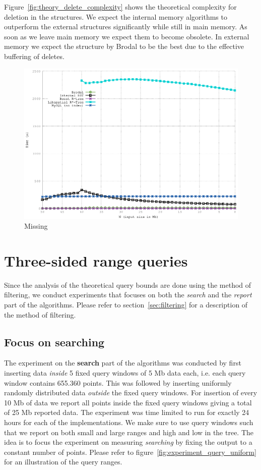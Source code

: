 \documentclass[twoside,11pt,openright]{report}
\begin{document}
Figure~\ref{fig:theory_delete_complexity} shows the theoretical complexity for deletion in the structures. We expect the internal memory algorithms to outperform the external structures significantly while still in main memory. As soon as we leave main memory we expect them to become obsolete. In external memory we expect the structure by Brodal to be the best due to the effective buffering of deletes.

\begin{figure}[htp!]
\includegraphics[width=\textwidth]{../src/experiments/delete_experiment_results/2016-05-27.10_10_14/time}
\caption{Missing}
\label{fig:delete_complexity_result}
\end{figure}

\clearpage

\section{Three-sided range queries}
Since the analysis of the theoretical query bounds are done using the method of filtering, we conduct experiments that focuses on both the \textit{search} and the \textit{report} part of the algorithms. Please refer to section~\ref{sec:filtering} for a description of the method of filtering.

\subsection{Focus on searching}
The experiment on the \textbf{search} part of the algorithms was conducted by first inserting data \textit{inside} 5 fixed query windows of 5 Mb data each, i.e. each query window contains 655.360 points. This was followed by inserting uniformly randomly distributed data \textit{outside} the fixed query windows. For insertion of every 10 Mb of data we report all points inside the fixed query windows giving a total of 25 Mb reported data. The experiment was time limited to run for exactly 24 hours for each of the implementations. We make sure to use query windows such that we report on both small and large ranges and high and low in the tree. The idea is to focus the experiment on measuring \textit{searching} by fixing the output to a constant number of points. Please refer to figure~\ref{fig:experiment_query_uniform} for an illustration of the query ranges.
\end{document}

